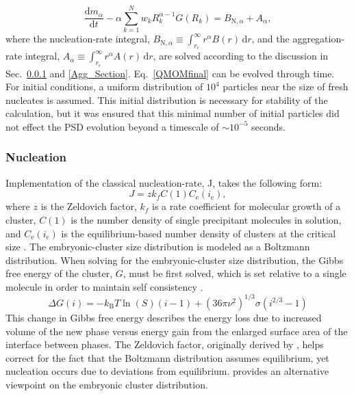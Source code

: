 \documentclass[preprint,3p,a4paper,times,12pt,authoryear]{elsarticle}
\begin{document}
\begin{equation}\label{QMOMfinal}
\frac{\mathrm{d} m_\alpha}{\mathrm{d} t}  - \alpha  \sum_{k=1}^N w_k R_k^{\alpha-1} G(R_k) =  B_{\text{N},\alpha} + A_{\alpha},
\end{equation}
where the nucleation-rate integral, $B_{\text{N},\alpha} \equiv \int_{r_{\text{c}}}^\infty r^\alpha B(r) \, \mathrm{d}r$, and the aggregation-rate integral, $A_{\alpha} \equiv \int_{r_{\text{c}}}^\infty r^\alpha A(r) \, \mathrm{d}r$, are solved according to the discussion in Sec.~\ref{Nuc_Section} and \ref{Agg_Section}.  Eq.~\ref{QMOMfinal} can be evolved through time. For initial conditions, a uniform distribution of $10^4$ particles near the size of fresh nucleates is assumed. This initial distribution is necessary for stability of the calculation, but it was ensured that this minimal number of initial particles did not effect the PSD evolution beyond a timescale of $\sim 10^{-5}$ seconds.

\subsubsection{Nucleation} 
\label{Nuc_Section}
Implementation of the classical nucleation-rate, J, takes the following form:
\begin{equation}\label{nucleationrate}
J =  z k_f C(1) C_{\text{e}}(i_\text{c}),
\end{equation} 
where $z$ is the Zeldovich factor, $k_f$ is a rate coefficient for molecular growth of a cluster, $C(1)$ is the number density of single precipitant molecules in solution, and $C_{\text{e}}(i_\text{c})$ is the equilibrium-based number density of clusters at the critical size \citep{Kashchiev2000}. The embryonic-cluster size distribution is modeled as a Boltzmann distribution.  When solving for the embryonic-cluster size distribution, the Gibbs free energy of the cluster, $G$, must be first solved, which is set relative to a single molecule in order to maintain self consistency \citep{Girshick1990,Kashchiev2000}.  
\begin{equation}
\Delta G(i) = -k_\text{B} T \ln (S)(i-1) + (36 \pi \nu^2)^{1/3}\sigma(i^{2/3} - 1)
\end{equation}
This change in Gibbs free energy describes the energy loss due to increased volume of the new phase versus energy gain from the enlarged surface area of the interface between phases. The Zeldovich factor, originally derived by \citet{Zeldovich1942}, helps correct for the fact that the Boltzmann distribution assumes equilibrium, yet nucleation occurs due to deviations from equilibrium.  \citet{Katz1977} provides an alternative viewpoint on the embryonic cluster distribution.
\end{document}
